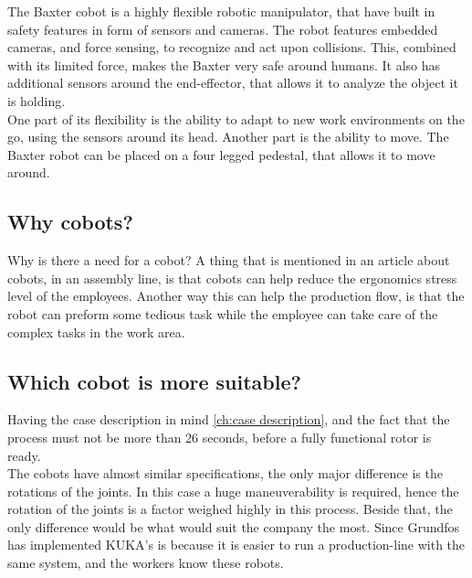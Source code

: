 The Baxter cobot is a highly flexible robotic manipulator, that have built in safety features in form of sensors and cameras. The robot features embedded cameras, and force sensing, to recognize and act upon collisions. This, combined with its limited force, makes the Baxter very safe around humans. 
It also has additional sensors around the end-effector, that allows it to analyze the object it is holding. \\
One part of its flexibility is the ability to adapt to new work environments on the go, using the sensors around its head. Another part is the ability to move. The Baxter robot can be placed on a four legged pedestal, that allows it to move around. \\


\subsection{Why cobots?}\label{ch:Whycobot}
Why is there a need for a cobot? A thing that is mentioned in an article about cobots, in an assembly line, is that cobots can help reduce the ergonomics stress level of the employees\cite{Coboau}. Another way this can help the production flow, is that the robot can preform some tedious task while the employee can take care of the complex tasks in the work area.\\

\subsection{Which cobot is more suitable?}

Having the case description in mind \ref{ch:case description}, and the fact that the process must not be more than 26 seconds, before a fully functional rotor is ready.\\
The cobots have almost similar specifications, the only major difference is the rotations of the joints. In this case a huge maneuverability is required, hence the rotation of the joints is a factor weighed highly in this process. Beside that, the only difference would be what would suit the company the most. Since Grundfos has implemented KUKA's is because it is easier to run a production-line with the same system, and the workers know these robots.\\


